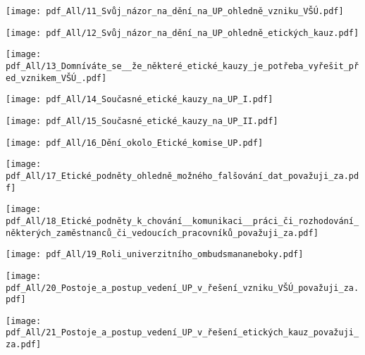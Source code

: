 {  \centerline{\texttt{[image: pdf\_All/11\_Svůj\_názor\_na\_dění\_na\_UP\_ohledně\_vzniku\_VŠÚ.pdf]}  } }


{  \centerline{\texttt{[image: pdf\_All/12\_Svůj\_názor\_na\_dění\_na\_UP\_ohledně\_etických\_kauz.pdf]}  } }


{  \centerline{\texttt{[image: pdf\_All/13\_Domníváte\_se\_\_že\_některé\_etické\_kauzy\_je\_potřeba\_vyřešit\_před\_vznikem\_VŠÚ\_.pdf]}  } }


{  \centerline{\texttt{[image: pdf\_All/14\_Současné\_etické\_kauzy\_na\_UP\_I.pdf]}  } }


{  \centerline{\texttt{[image: pdf\_All/15\_Současné\_etické\_kauzy\_na\_UP\_II.pdf]}  } }


{  \centerline{\texttt{[image: pdf\_All/16\_Dění\_okolo\_Etické\_komise\_UP.pdf]}  } }


{  \centerline{\texttt{[image: pdf\_All/17\_Etické\_podněty\_ohledně\_možného\_falšování\_dat\_považuji\_za.pdf]}  } }


{  \centerline{\texttt{[image: pdf\_All/18\_Etické\_podněty\_k\_chování\_\_komunikaci\_\_práci\_či\_rozhodování\_některých\_zaměstnanců\_či\_vedoucích\_pracovníků\_považuji\_za.pdf]}  } }


{  \centerline{\texttt{[image: pdf\_All/19\_Roli\_univerzitního\_ombudsmananeboky.pdf]}  } }


{  \centerline{\texttt{[image: pdf\_All/20\_Postoje\_a\_postup\_vedení\_UP\_v\_řešení\_vzniku\_VŠÚ\_považuji\_za.pdf]}  } }


{  \centerline{\texttt{[image: pdf\_All/21\_Postoje\_a\_postup\_vedení\_UP\_v\_řešení\_etických\_kauz\_považuji\_za.pdf]}  } }


